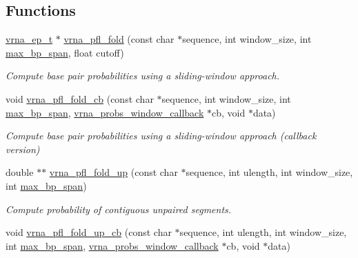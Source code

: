 \subsection*{Functions}
\begin{DoxyCompactItemize}
\item 
\mbox{\hyperlink{group__struct__utils_gab9ac98ab55ded9fb90043b024b915aca}{vrna\+\_\+ep\+\_\+t}} $\ast$ \mbox{\hyperlink{group__local__pf__fold_ga6267230f20cab0e2315375310b4dad85}{vrna\+\_\+pfl\+\_\+fold}} (const char $\ast$sequence, int window\+\_\+size, int \mbox{\hyperlink{group__model__details_ga18df869af0d70101106458fc3f027806}{max\+\_\+bp\+\_\+span}}, float cutoff)
\begin{DoxyCompactList}\small\item\em Compute base pair probabilities using a sliding-\/window approach. \end{DoxyCompactList}\item 
void \mbox{\hyperlink{group__local__pf__fold_ga8dc3788e66420f524f2bfc0b685a939d}{vrna\+\_\+pfl\+\_\+fold\+\_\+cb}} (const char $\ast$sequence, int window\+\_\+size, int \mbox{\hyperlink{group__model__details_ga18df869af0d70101106458fc3f027806}{max\+\_\+bp\+\_\+span}}, \mbox{\hyperlink{_l_pfold_8h_abe710a1182e6db69cc75329dfc9bed67}{vrna\+\_\+probs\+\_\+window\+\_\+callback}} $\ast$cb, void $\ast$data)
\begin{DoxyCompactList}\small\item\em Compute base pair probabilities using a sliding-\/window approach (callback version) \end{DoxyCompactList}\item 
double $\ast$$\ast$ \mbox{\hyperlink{group__local__pf__fold_ga1dd5c51b797c961124912e289bff553a}{vrna\+\_\+pfl\+\_\+fold\+\_\+up}} (const char $\ast$sequence, int ulength, int window\+\_\+size, int \mbox{\hyperlink{group__model__details_ga18df869af0d70101106458fc3f027806}{max\+\_\+bp\+\_\+span}})
\begin{DoxyCompactList}\small\item\em Compute probability of contiguous unpaired segments. \end{DoxyCompactList}\item 
void \mbox{\hyperlink{group__local__pf__fold_ga8958d91b1f1aebfb32b58805d141ccf3}{vrna\+\_\+pfl\+\_\+fold\+\_\+up\+\_\+cb}} (const char $\ast$sequence, int ulength, int window\+\_\+size, int \mbox{\hyperlink{group__model__details_ga18df869af0d70101106458fc3f027806}{max\+\_\+bp\+\_\+span}}, \mbox{\hyperlink{_l_pfold_8h_abe710a1182e6db69cc75329dfc9bed67}{vrna\+\_\+probs\+\_\+window\+\_\+callback}} $\ast$cb, void $\ast$data)
$$
\end{DoxyCompactItemize}
